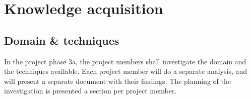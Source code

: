 
\section{Knowledge acquisition}
\label{sec:knowledge-acquisition}

\subsection{Domain \& techniques}
%
In the project phase 3a, the project members shall investigate the domain and the techniques available.
Each project member will do a separate analysis, and will present a separate document with their findings.
The planning of the investigation is presented a section per project member.

